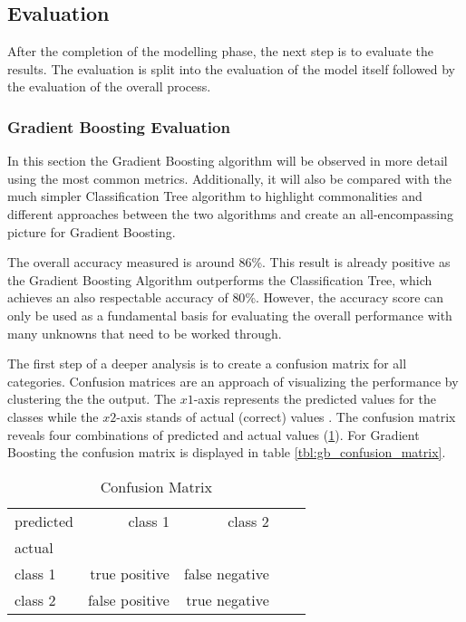 \subsection{Evaluation}

After the completion of the modelling phase, the next step is to evaluate the results. The evaluation is split into 
the evaluation of the model itself followed by the evaluation of the overall process. 

\subsubsection{Gradient Boosting Evaluation}

In this section the Gradient Boosting algorithm will be observed in more detail using the most common metrics. Additionally, it will also
be compared with the much simpler Classification Tree algorithm to highlight commonalities and different approaches between 
the two algorithms and create an all-encompassing picture for Gradient Boosting. 

The overall accuracy measured is around \(86\)\%. This result is already positive as the Gradient Boosting Algorithm outperforms 
the Classification Tree, which achieves an also respectable accuracy of \(80\)\%. However, the accuracy score can only be used as a
fundamental basis for evaluating the overall performance with many unknowns that need to be worked through.

The first step of a deeper analysis is to create a confusion matrix for all categories. Confusion matrices are an approach of 
visualizing the performance by clustering the the output. The \(x1\)-axis represents the predicted values for the classes 
while the \(x2\)-axis stands of actual (correct) values \cite[p.235]{Davis_2006}. The confusion matrix reveals four combinations of predicted 
and actual values (\ref{tbl:evaluation_confusion_matrix}). For Gradient Boosting the confusion matrix is displayed in table \ref{tbl:gb_confusion_matrix}.

\begin{table}[H]
  \centering
  \begin{tabular}{lrrrr}
    \toprule
    predicted & class 1         &  class 2          \\
    actual    &                 &                   \\
    \midrule
    class 1   &  true positive  &  false negative   \\
    class 2   &  false positive &  true negative    \\
    \bottomrule
    \end{tabular}
  \caption{Confusion Matrix}%
  \label{tbl:evaluation_confusion_matrix}%
\end{table} 

